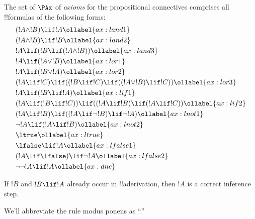 

\begin{defn}[Axioms]
The set of $\PAx$ of \emph{axioms} for the propositional connectives comprises
all !!{formula}s of the following forms:
\begin{align}
  & (!A \land !B) \lif !A \ollabel{ax:land1}\\
  & (!A \land !B) \lif !B \ollabel{ax:land2}\\
  & !A \lif (!B \lif (!A \land !B)) \ollabel{ax:land3}\\
  & !A \lif (!A \lor !B) \ollabel{ax:lor1}\\
  & !A \lif (!B \lor !A) \ollabel{ax:lor2}\\
  & (!A \lif !C) \lif ((!B \lif !C) \lif ((!A \lor !B) \lif !C)) \ollabel{ax:lor3}\\
  & !A \lif (!B \lif !A) \ollabel{ax:lif1}\\
  & (!A \lif (!B \lif !C)) \lif ((!A \lif !B) \lif (!A \lif !C)) \ollabel{ax:lif2}\\
  & (!A \lif !B) \lif ((!A \lif \lnot !B) \lif \lnot !A) \ollabel{ax:lnot1}\\
  & \lnot !A \lif (!A \lif !B) \ollabel{ax:lnot2}\\
  & \ltrue \ollabel{ax:ltrue}\\
  & \lfalse \lif !A \ollabel{ax:lfalse1}\\
  & (!A \lif \lfalse) \lif \lnot !A \ollabel{ax:lfalse2}\\
  & \lnot\lnot !A \lif !A \ollabel{ax:dne}
\end{align}
\end{defn}

\begin{defn}
  If $!B$ and $!B \lif !A$ already occur in !!a{derivation}, then $!A$ is
  a correct inference step.
\end{defn}

We'll abbreviate the rule modus ponens as ``\MP.''










